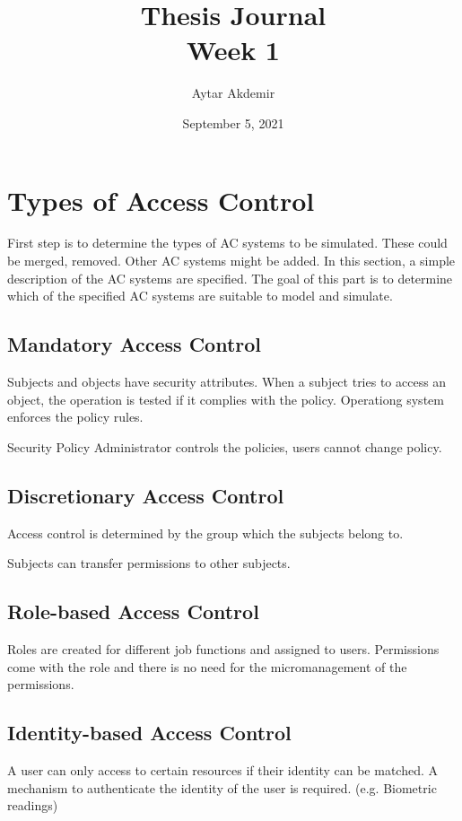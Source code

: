 \documentclass[11pt]{article} %
\title{Thesis Journal \\ Week 1}
\author{Aytar Akdemir}
\date{September 5, 2021} %
\begin{document}
\maketitle

\section{Types of Access Control}

First step is to determine the types of AC systems to be simulated.
These could be merged, removed. Other AC systems might be added.
In this section, a simple description of the AC systems are specified.
The goal of this part is to determine which of the specified AC systems are suitable to model and simulate.

\subsection{Mandatory Access Control}

Subjects and objects have security attributes.
When a subject tries to access an object, the operation is tested if it complies with the policy.
Operationg system enforces the policy rules.

Security Policy Administrator controls the policies, users cannot change policy.

\subsection{Discretionary Access Control}
Access control is determined by the group which the subjects belong to.

Subjects can transfer permissions to other subjects.

\subsection{Role-based Access Control}

Roles are created for different job functions and assigned to users.
Permissions come with the role and there is no need for the micromanagement of the permissions.


\subsection{Identity-based Access Control}

A user can only access to certain resources if their identity can be matched.
A mechanism to authenticate the identity of the user is required. (e.g. Biometric readings)
\end{document}
